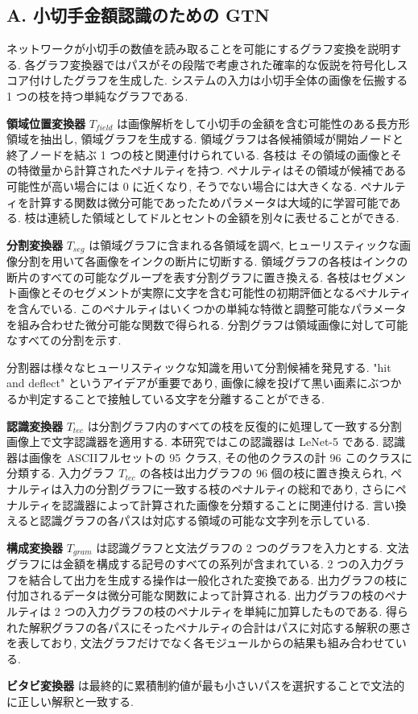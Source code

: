 \documentclass[twocolumn]{jarticle}     %
\begin{document}
\subsection*{A. 小切手金額認識のための GTN}
ネットワークが小切手の数値を読み取ることを可能にするグラフ変換を説明する. 
各グラフ変換器ではパスがその段階で考慮された確率的な仮説を符号化しスコア付けしたグラフを生成した. 
システムの入力は小切手全体の画像を伝搬する 1 つの枝を持つ単純なグラフである. 
\par
\textbf{領域位置変換器} $T_{field}$ は画像解析をして小切手の金額を含む可能性のある長方形領域を抽出し, 領域グラフを生成する. 領域グラフは各候補領域が開始ノードと終了ノードを結ぶ 1 つの枝と関連付けられている. 各枝は
その領域の画像とその特徴量から計算されたペナルティを持つ. ペナルティはその領域が候補である可能性が高い場合には 0 に近くなり, そうでない場合には大きくなる. ペナルティを計算する関数は微分可能であったためパラメータは大域的に学習可能である. 
枝は連続した領域としてドルとセントの金額を別々に表せることができる.
\par
\textbf{分割変換器} $T_{seg}$ は領域グラフに含まれる各領域を調べ, ヒューリスティックな画像分割を用いて各画像をインクの断片に切断する. 領域グラフの各枝はインクの断片のすべての可能なグループを表す分割グラフに置き換える. 各枝はセグメント画像とそのセグメントが実際に文字を含む可能性の初期評価となるペナルティを含んでいる.
このペナルティはいくつかの単純な特徴と調整可能なパラメータを組み合わせた微分可能な関数で得られる. 分割グラフは領域画像に対して可能なすべての分割を示す.\par
分割器は様々なヒューリスティックな知識を用いて分割候補を発見する. "hit and deflect" というアイデアが重要であり, 画像に線を投げて黒い画素にぶつかるか判定することで接触している文字を分離することができる. 
\par
\textbf{認識変換器} $T_{tec}$ は分割グラフ内のすべての枝を反復的に処理して一致する分割画像上で文字認識器を適用する. 
本研究ではこの認識器は LeNet-5 である. 
認識器は画像を ASCIIフルセットの 95 クラス, その他のクラスの計 96 このクラスに分類する. 入力グラフ $T_{tec}$ の各枝は出力グラフの 96 個の枝に置き換えられ, ペナルティは入力の分割グラフに一致する枝のペナルティの総和であり, さらにペナルティを認識器によって計算された画像を分類することに関連付ける. 言い換えると認識グラフの各パスは対応する領域の可能な文字列を示している. 
\par
\textbf{構成変換器} $T_{gram}$ は認識グラフと文法グラフの 2 つのグラフを入力とする. 文法グラフには金額を構成する記号のすべての系列が含まれている. 2 つの入力グラフを結合して出力を生成する操作は一般化された変換である. 出力グラフの枝に付加されるデータは微分可能な関数によって計算される. 出力グラフの枝のペナルティは 2 つの入力グラフの枝のペナルティを単純に加算したものである. 得られた解釈グラフの各パスにそったペナルティの合計はパスに対応する解釈の悪さを表しており, 文法グラフだけでなく各モジュールからの結果も組み合わせている. 
\par
\textbf{ビタビ変換器} は最終的に累積制約値が最も小さいパスを選択することで文法的に正しい解釈と一致する. 
\end{document}
